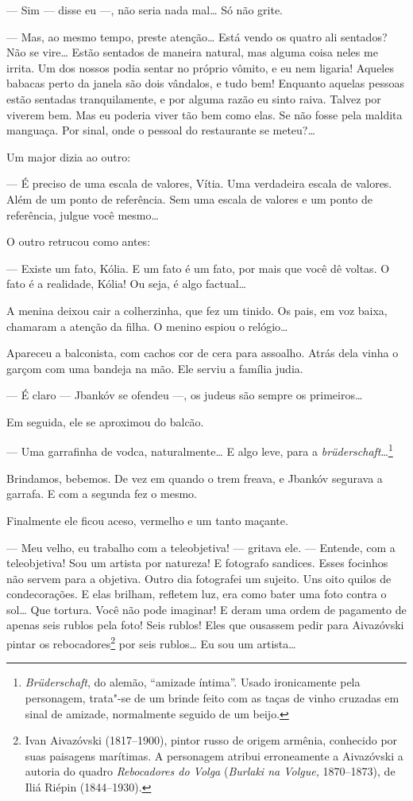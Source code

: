 --- Sim --- disse eu ---, não seria nada mal\ldots{} Só
não grite.

--- Mas, ao mesmo tempo, preste atenção\ldots{} Está vendo os quatro
ali sentados? Não se vire\ldots{} Estão sentados de maneira natural, mas
alguma coisa neles me irrita. Um dos nossos podia sentar no próprio
vômito, e eu nem ligaria! Aqueles babacas perto da janela são dois
vândalos, e tudo bem! Enquanto aquelas pessoas estão sentadas
tranquilamente, e por alguma razão eu sinto raiva. Talvez por viverem
bem. Mas eu poderia viver tão bem como elas. Se não fosse pela maldita
manguaça. Por sinal, onde o pessoal do restaurante se meteu?\ldots{}

Um major dizia ao outro:

--- É preciso de uma escala de valores, Vítia. Uma verdadeira
escala de valores. Além de um ponto de referência. Sem uma escala de
valores e um ponto de referência, julgue você mesmo\ldots{}

O outro retrucou como antes:

--- Existe um fato, Kólia. E um fato é um fato, por mais que você
dê voltas. O fato é a realidade, Kólia! Ou seja, é algo factual\ldots{}

A menina deixou cair a colherzinha, que fez um tinido. Os pais, em voz
baixa, chamaram a atenção da filha. O menino espiou o relógio\ldots{}

Apareceu a balconista, com cachos cor de cera para assoalho. Atrás dela
vinha o garçom com uma bandeja na mão. Ele serviu a família judia.

--- É claro --- Jbankóv se ofendeu ---, os judeus
são sempre os primeiros\ldots{}

Em seguida, ele se aproximou do balcão.

--- Uma garrafinha de vodca, naturalmente\ldots{} E algo leve, para a
\emph{brüderschaft}\ldots{}\footnote{\emph{Brüderschaft}, do alemão,
  ``amizade íntima''. Usado ironicamente pela personagem, trata"-se de um
  brinde feito com as taças de vinho cruzadas em sinal de amizade,
  normalmente seguido de um beijo.}

Brindamos, bebemos. De vez em quando o trem freava, e Jbankóv segurava a
garrafa. E com a segunda fez o mesmo.

Finalmente ele ficou aceso, vermelho e um tanto maçante.

--- Meu velho, eu trabalho com a teleobjetiva! --- gritava
ele. --- Entende, com a teleobjetiva! Sou um artista por
natureza! E fotografo sandices. Esses focinhos não servem para a
objetiva. Outro dia fotografei um sujeito. Uns oito quilos de
condecorações. E elas brilham, refletem luz, era como bater uma foto
contra o sol\ldots{} Que tortura. Você não pode imaginar! E deram uma ordem
de pagamento de apenas seis rublos pela foto! Seis rublos! Eles que
ousassem pedir para Aivazóvski pintar os rebocadores\footnote{Ivan
  Aivazóvski (1817--1900), pintor russo de origem armênia, conhecido por
  suas paisagens marítimas. A personagem atribui erroneamente a
  Aivazóvski a autoria do quadro \emph{Rebocadores do Volga}
  (\emph{Burlaki na Volgue,} 1870--1873), de Iliá Riépin (1844--1930).}
por seis rublos\ldots{} Eu sou um artista\ldots{}

